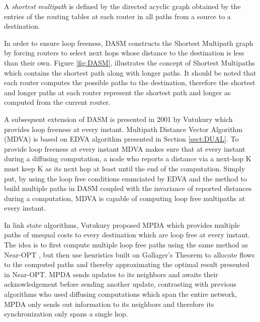 \begin{definition}
  A \emph{shortest multipath} is defined by the directed acyclic graph obtained by the entries of the routing tables at each router in all paths from a source to a destination.
\end{definition}


In order to ensure loop freeness, DASM constructs the Shortest Multipath graph by forcing routers to select next hops whose distance to the destination is less than their own. Figure \ref{fig:DASM}, illustrates the concept of Shortest Multipaths which contains the shortest path along with longer paths. It should be noted that each router computes the possible paths to the destination, therefore the shortest and longer paths at each router represent the shortest path and longer as computed from the current router.

A subsequent extension of DASM is presented in 2001 by Vutukury which provides loop freeness at every instant. Multipath Distance Vector Algorithm (MDVA) \cite{MDVA} is based on EDVA \cite{EDVA} algorithm presented in Section \ref{sect:DUAL}. To provide loop freeness at every instant MDVA makes sure that at every instant during a diffusing computation, a node who reports a distance via a next-hop K must keep K as its next hop at least until the end of the computation. Simply put, by using the loop free conditions enunciated by EDVA and the method to build multiple paths in DASM coupled with the invariance of reported distances during a computation, MDVA is capable of computing loop free multipaths at every instant.

 In link state algorithms, Vutukury proposed MPDA \cite{MPDA} which provides multiple paths of unequal costs to every destination which are loop free at every instant. The idea is to first compute multiple loop free paths using the same method as Near-OPT \cite{NearOPT}, but then use heuristics built on Gallager's Theorem \cite{Gallager-mindelay} to allocate flows to the computed paths and thereby approximating the optimal result presented in Near-OPT. MPDA sends updates to its neighbors and awaits their acknowledgement before sending another update, contrasting with previous algorithms who used diffusing computations which span the entire network, MPDA only sends out information to its neighbors and therefore its synchronization only spans a single hop.

